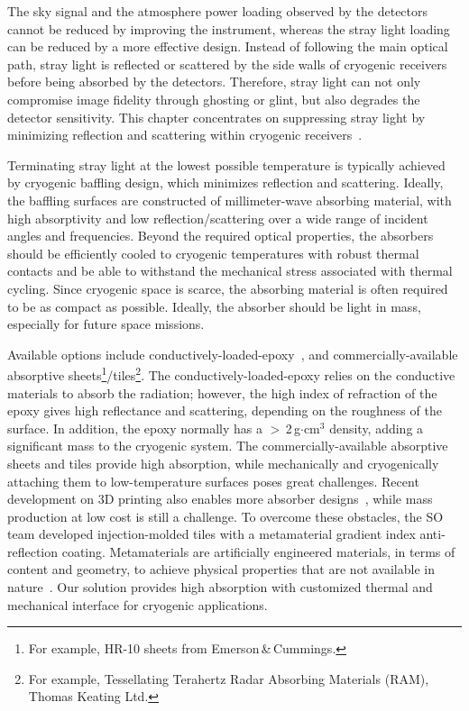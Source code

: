 The sky signal and the atmosphere power loading observed by the detectors cannot be reduced by improving the instrument, whereas the stray light loading can be reduced by a more effective design. Instead of following the main optical path, stray light is reflected or scattered by the side walls of cryogenic receivers before being absorbed by the detectors. Therefore, stray light can not only compromise image fidelity through ghosting or glint, but also degrades the detector sensitivity. This chapter concentrates on suppressing stray light by minimizing reflection and scattering within cryogenic receivers~\cite{iuliano/etal:2018, thornton_2016, sharp/etal:2008}.

Terminating stray light at the lowest possible temperature is typically achieved by cryogenic baffling design, which minimizes reflection and scattering.  Ideally, the baffling surfaces are constructed of millimeter-wave absorbing material, with high absorptivity and low reflection/scattering over a wide range of incident angles and frequencies. Beyond the required optical properties, the absorbers should be efficiently cooled to cryogenic temperatures with robust thermal contacts and be able to withstand the mechanical stress associated with thermal cycling. Since cryogenic space is scarce, the absorbing material is often required to be as compact as possible. Ideally, the absorber should be light in mass, especially for future space missions.

Available options include conductively-loaded-epoxy~\citep{Wollack2008}, and commercially-available absorptive sheets\footnote{For example, HR-10 sheets from Emerson\,\&\,Cummings.}/tiles\footnote{For example, Tessellating Terahertz Radar Absorbing Materials (RAM), Thomas Keating Ltd.}. The conductively-loaded-epoxy relies on the conductive materials to absorb the radiation; however, the high index of refraction of the epoxy gives high reflectance and scattering, depending on the roughness of the surface. In addition, the epoxy normally has a $>$\,2\,g$\cdot$cm$^3$ density, adding a significant mass to the cryogenic system. The commercially-available absorptive sheets and tiles provide high absorption, while mechanically and cryogenically attaching them to low-temperature surfaces poses great challenges. Recent development on 3D printing also enables more absorber designs~\cite{petroff/etal:2019}, while mass production at low cost is still a challenge. To overcome these obstacles, the SO team developed injection-molded tiles with a metamaterial gradient index anti-reflection coating. Metamaterials are artificially engineered materials, in terms of content and geometry, to achieve physical properties that are not available in nature~\cite{wollack/etal:2016, ding/etal:2012, watts/liu/padilla:2012}. Our solution provides high absorption with customized thermal and mechanical interface for cryogenic applications. 

